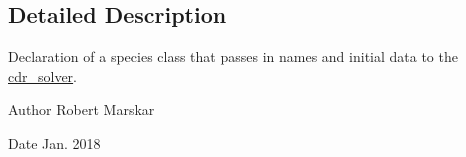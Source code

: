 \subsection{Detailed Description}
Declaration of a species class that passes in names and initial data to the \hyperlink{classcdr__solver}{cdr\+\_\+solver}. 

\begin{DoxyAuthor}{Author}
Robert Marskar 
\end{DoxyAuthor}
\begin{DoxyDate}{Date}
Jan. 2018 
\end{DoxyDate}
